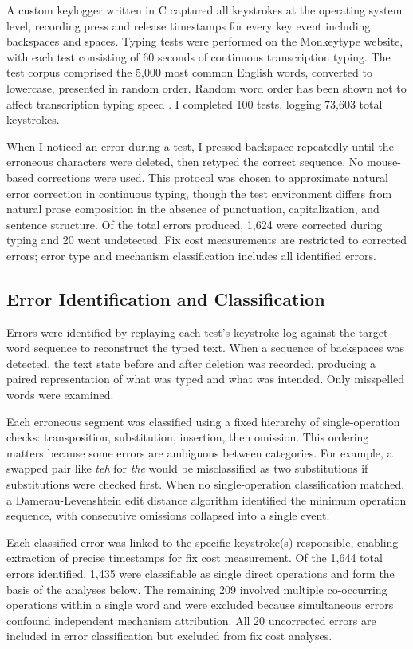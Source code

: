 \documentclass[12pt]{article}
\begin{document}
A custom keylogger written in C captured all keystrokes at the operating system level, recording press and release timestamps for every key event including backspaces and spaces. Typing tests were performed on the Monkeytype website, with each test consisting of 60 seconds of continuous transcription typing. The test corpus comprised the 5,000 most common English words, converted to lowercase, presented in random order. Random word order has been shown not to affect transcription typing speed \citep{salthouse1986}. I completed 100 tests, logging 73,603 total keystrokes.

When I noticed an error during a test, I pressed backspace repeatedly until the erroneous characters were deleted, then retyped the correct sequence. No mouse-based corrections were used. This protocol was chosen to approximate natural error correction in continuous typing, though the test environment differs from natural prose composition in the absence of punctuation, capitalization, and sentence structure. Of the total errors produced, 1,624 were corrected during typing and 20 went undetected. Fix cost measurements are restricted to corrected errors; error type and mechanism classification includes all identified errors.

\subsection{Error Identification and Classification}

Errors were identified by replaying each test's keystroke log against the target word sequence to reconstruct the typed text. When a sequence of backspaces was detected, the text state before and after deletion was recorded, producing a paired representation of what was typed and what was intended. Only misspelled words were examined.

Each erroneous segment was classified using a fixed hierarchy of single-operation checks: transposition, substitution, insertion, then omission. This ordering matters because some errors are ambiguous between categories. For example, a swapped pair like \textit{teh} for \textit{the} would be misclassified as two substitutions if substitutions were checked first. When no single-operation classification matched, a Damerau-Levenshtein edit distance algorithm identified the minimum operation sequence, with consecutive omissions collapsed into a single event.

Each classified error was linked to the specific keystroke(s) responsible, enabling extraction of precise timestamps for fix cost measurement. Of the 1,644 total errors identified, 1,435 were classifiable as single direct operations and form the basis of the analyses below. The remaining 209 involved multiple co-occurring operations within a single word and were excluded because simultaneous errors confound independent mechanism attribution. All 20 uncorrected errors are included in error classification but excluded from fix cost analyses.
\end{document}
